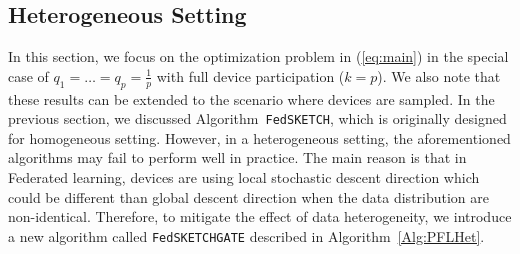 \documentclass[twoside]{article}
\begin{document}
\subsection{Heterogeneous Setting}
\vspace{-0.05in}
In this section, we focus on the optimization problem in (\ref{eq:main}) in the special case of $q_1=\ldots=q_p=\frac{1}{p}$ with full device participation ($k=p$). 
We also note that these results can be extended to the scenario where devices are sampled.
In the previous section, we discussed Algorithm~\texttt{FedSKETCH}, which is originally designed for homogeneous setting.
However, in a heterogeneous setting, the aforementioned algorithms may fail to perform well in practice. 
The main reason is that in Federated learning, devices are using local stochastic descent direction which could be different than global descent direction when the data distribution are non-identical. 
Therefore, to mitigate the effect of data heterogeneity, we introduce a new algorithm called \texttt{FedSKETCHGATE} described in Algorithm~\ref{Alg:PFLHet}. 
\end{document}
